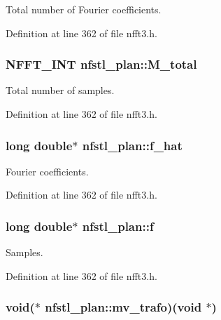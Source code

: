 Total number of Fourier coefficients. 



Definition at line 362 of file nfft3.\-h.

\hypertarget{structnfstl__plan_a7ad9bc25c224f2cd3eed37e594824f9c}{
\subsubsection[{M\-\_\-total}]{\setlength{\rightskip}{0pt plus 5cm}N\-F\-F\-T\-\_\-\-I\-N\-T nfstl\-\_\-plan\-::\-M\-\_\-total}}\label{structnfstl__plan_a7ad9bc25c224f2cd3eed37e594824f9c}


Total number of samples. 



Definition at line 362 of file nfft3.\-h.

\hypertarget{structnfstl__plan_aa0a56037700b7a3d428c77e353dc209e}{
\subsubsection[{f\-\_\-hat}]{\setlength{\rightskip}{0pt plus 5cm}long double$\ast$ nfstl\-\_\-plan\-::f\-\_\-hat}}\label{structnfstl__plan_aa0a56037700b7a3d428c77e353dc209e}


Fourier coefficients. 



Definition at line 362 of file nfft3.\-h.

\hypertarget{structnfstl__plan_ad4f7ff9f286c0203712d5f16b21e9e4e}{
\subsubsection[{f}]{\setlength{\rightskip}{0pt plus 5cm}long double$\ast$ nfstl\-\_\-plan\-::f}}\label{structnfstl__plan_ad4f7ff9f286c0203712d5f16b21e9e4e}


Samples. 



Definition at line 362 of file nfft3.\-h.

\hypertarget{structnfstl__plan_adbe7e6be1061160223c10b6567efda40}{
\subsubsection[{mv\-\_\-trafo}]{\setlength{\rightskip}{0pt plus 5cm}void($\ast$ nfstl\-\_\-plan\-::mv\-\_\-trafo)(void $\ast$)}}\label{structnfstl__plan_adbe7e6be1061160223c10b6567efda40}


